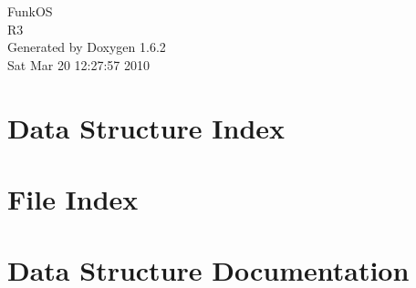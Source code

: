 \documentclass[a4paper]{book}
\begin{document}
\begin{titlepage}
\vspace*{7cm}
\begin{center}
{\Large FunkOS \\[1ex]\large R3 }\\
\vspace*{1cm}
{\large Generated by Doxygen 1.6.2}\\
\vspace*{0.5cm}
{\small Sat Mar 20 12:27:57 2010}\\
\end{center}
\end{titlepage}
\clearemptydoublepage
{}
\tableofcontents
\clearemptydoublepage
{}
\chapter{Data Structure Index}

\chapter{File Index}

\chapter{Data Structure Documentation}

































\end{document}
